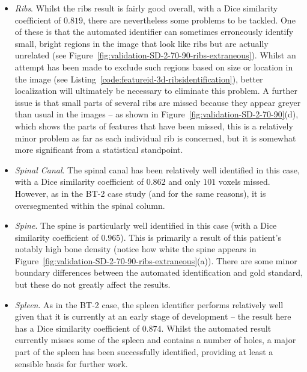 \begin{itemize}
\item \emph{Ribs}. Whilst the ribs result is fairly good overall, with a Dice similarity coefficient of $0.819$, there are nevertheless some problems to be tackled. One of these is that the automated identifier can sometimes erroneously identify small, bright regions in the image that look like ribs but are actually unrelated (see Figure~\ref{fig:validation-SD-2-70-90-ribs-extraneous}). Whilst an attempt has been made to exclude such regions based on size or location in the image (see Listing~\ref{code:featureid-3d-ribsidentification}), better localization will ultimately be necessary to eliminate this problem. A further issue is that small parts of several ribs are missed because they appear greyer than usual in the images -- as shown in Figure~\ref{fig:validation-SD-2-70-90}(d), which shows the parts of features that have been missed, this is a relatively minor problem as far as each individual rib is concerned, but it is somewhat more significant from a statistical standpoint.

\item \emph{Spinal Canal}. The spinal canal has been relatively well identified in this case, with a Dice similarity coefficient of $0.862$ and only $101$ voxels missed. However, as in the BT-2 case study (and for the same reasons), it is oversegmented within the spinal column.

\item \emph{Spine}. The spine is particularly well identified in this case (with a Dice similarity coefficient of $0.965$). This is primarily a result of this patient's notably high bone density (notice how white the spine appears in Figure~\ref{fig:validation-SD-2-70-90-ribs-extraneous}(a)). There are some minor boundary differences between the automated identification and gold standard, but these do not greatly affect the results.

\item \emph{Spleen}. As in the BT-2 case, the spleen identifier performs relatively well given that it is currently at an early stage of development -- the result here has a Dice similarity coefficient of $0.874$. Whilst the automated result currently misses some of the spleen and contains a number of holes, a major part of the spleen has been successfully identified, providing at least a sensible basis for further work.

\end{itemize}

